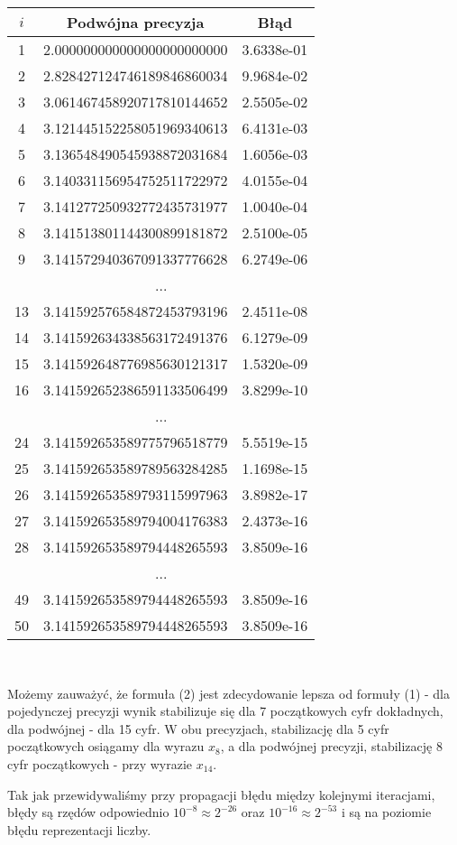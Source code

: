 \documentclass[10pt,wide]{mwart}
\theoremstyle{definition}
\begin{document}
\begin{minipage}[t]{0.5\textwidth}
  \begin{tabular}{|c||c|c||} \hline
    \(i\) & Podwójna precyzja & Błąd  \\ \hline
    1 & 2.000000000000000000000000 & 3.6338e-01 \\ \hline
    2 & 2.828427124746189846860034 & 9.9684e-02 \\ \hline
    3 & 3.061467458920717810144652 & 2.5505e-02 \\ \hline
    4 & 3.121445152258051969340613 & 6.4131e-03 \\ \hline
    5 & 3.136548490545938872031684 & 1.6056e-03 \\ \hline
    6 & 3.140331156954752511722972 & 4.0155e-04 \\ \hline
    7 & 3.141277250932772435731977 & 1.0040e-04 \\ \hline
    8 & 3.141513801144300899181872 & 2.5100e-05 \\ \hline
    9 & 3.141572940367091337776628 & 6.2749e-06 \\ \hline
    \multicolumn{3}{|c|}{...} \\ \hline
    13 & 3.141592576584872453793196 & 2.4511e-08 \\ \hline
    14 & 3.141592634338563172491376 & 6.1279e-09 \\ \hline
    15 & 3.141592648776985630121317 & 1.5320e-09 \\ \hline
    16 & 3.141592652386591133506499 & 3.8299e-10 \\ \hline
    \multicolumn{3}{|c|}{...} \\ \hline
    24 & 3.141592653589775796518779 & 5.5519e-15 \\ \hline
    25 & 3.141592653589789563284285 & 1.1698e-15 \\ \hline
    26 & 3.141592653589793115997963 & 3.8982e-17 \\ \hline
    27 & 3.141592653589794004176383 & 2.4373e-16 \\ \hline
    28 & 3.141592653589794448265593 & 3.8509e-16 \\ \hline
    \multicolumn{3}{|c|}{...}\\ \hline
    49 & 3.141592653589794448265593 & 3.8509e-16 \\ \hline
    50 & 3.141592653589794448265593 & 3.8509e-16 \\ \hline
  \end{tabular}
\end{minipage}
\\
\par Możemy zauważyć, że formuła (2) jest zdecydowanie lepsza od formuły (1) -
dla pojedynczej precyzji wynik stabilizuje się dla 7 początkowych cyfr dokładnych, dla podwójnej -
dla 15 cyfr. W obu precyzjach, stabilizację dla 5 cyfr początkowych osiągamy dla wyrazu \(x_{8}\), a dla podwójnej precyzji, stabilizację 8 cyfr początkowych - przy wyrazie \(x_{14}\).
\par Tak jak przewidywaliśmy przy propagacji błędu między kolejnymi iteracjami,
błędy są rzędów odpowiednio \(10^{-8} \approx 2^{-26}\) oraz \(10^{-16} \approx 2^{-53}\) i są na poziomie błędu reprezentacji liczby.
\end{document}
